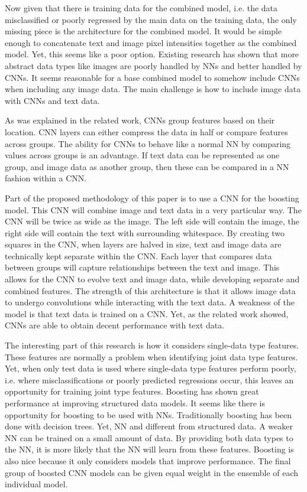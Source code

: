 Now given that there is training data for the combined model, i.e. the data misclassified or poorly regressed by the main data on the training data, the only missing piece is the architecture for the combined model.  It would be simple enough to concatenate text and image pixel intensities together as the combined model.  Yet, this seems like a poor option.  Existing research has shown that more abstract data types like images are poorly handled by NNs and better handled by CNNs.  It seems reasonable for a base combined model to somehow include CNNs when including any image data.  The main challenge is how to include image data with CNNs and text data.

As was explained in the related work, CNNs group features based on their location.  CNN layers can either compress the data in half or compare features across groups.  The ability for CNNs to behave like a normal NN by comparing values across groups is an advantage.  If text data can be represented as one group, and image data as another group, then these can be compared in a NN fashion within a CNN.

Part of the proposed methodology of this paper is to use a CNN for the boosting model.  This CNN will combine image and text data in a very particular way.  The CNN will be twice as wide as the image.  The left side will contain the image, the right side will contain the text with surrounding whitespace. By creating two squares in the CNN, when layers are halved in size, text and image data are technically kept separate within the CNN.  Each layer that compares data between groups will capture relationships between the text and image.  This allows for the CNN to evolve text and image data, while developing separate and combined features. The strength of this architecture is that it allows image data to undergo convolutions while interacting with the text data.  A weakness of the model is that text data is trained on a CNN.  Yet, as the related work showed, CNNs are able to obtain decent performance with text data.

The interesting part of this research is how it considers single-data type features.  These features are normally a problem when identifying joint data type features.  Yet, when only test data is used where single-data type features perform poorly, i.e. where misclassifications or poorly predicted regressions occur, this leaves an opportunity for training joint type features.  Boosting has shown great performance at improving structured data models.  It seems like there is opportunity for boosting to be used with NNs.  Traditionally boosting has been done with decision trees.  Yet, NN and different from structured data.  A weaker NN can be trained on a small amount of data.  By providing both data types to the NN, it is more likely that the NN will learn from these features.  Boosting is also nice because it only considers models that improve performance.  The final group of boosted CNN models can be given equal weight in the ensemble of each individual model.

